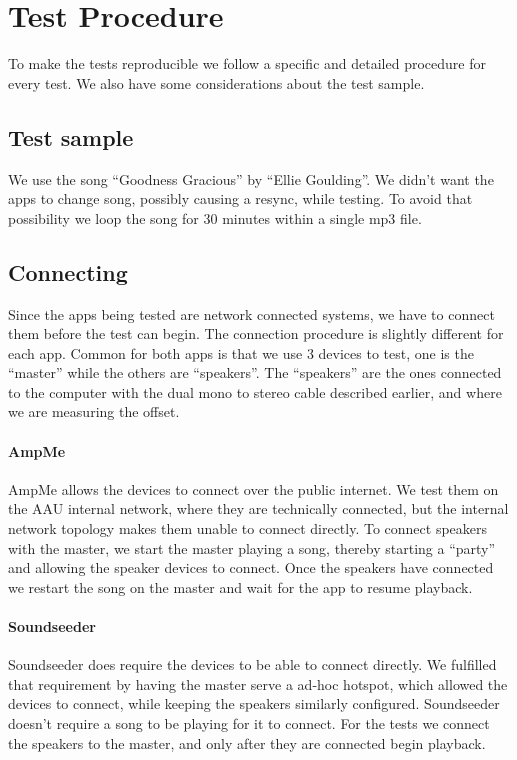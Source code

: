 \section{Test Procedure}\label{sec:test_procedure}
To make the tests reproducible we follow a specific and detailed
procedure for every test. We also have some considerations about the
test sample.

\subsection{Test sample}
We use the song ``Goodness Gracious'' by ``Ellie Goulding''.  We didn't
want the apps to change song, possibly causing a resync, while testing.
To avoid that possibility we loop the song for 30 minutes within
a single mp3 file. 

\subsection{Connecting}
Since the apps being tested are network connected systems, we have to
connect them before the test can begin. The connection procedure is
slightly different for each app. Common for both apps is that we use
3 devices to test, one is the ``master'' while the others are
``speakers''. The ``speakers'' are the ones connected to the computer
with the dual mono to stereo cable described earlier, and where we are
measuring the offset.

\paragraph{AmpMe}
AmpMe allows the devices to connect over the public internet. We test
them on the AAU internal network, where they are technically connected,
but the internal network topology makes them unable to connect directly.
To connect speakers with the master, we start the master playing a song,
thereby starting a ``party'' and allowing the speaker devices to
connect. Once the speakers have connected we restart the song on the
master and wait for the app to resume playback.

\paragraph{Soundseeder}
Soundseeder does require the devices to be able to connect directly. We
fulfilled that requirement by having the master serve a ad-hoc hotspot,
which allowed the devices to connect, while keeping the speakers
similarly configured. Soundseeder doesn't require a song to be playing
for it to connect. For the tests we connect the speakers to the master,
and only after they are connected begin playback.

